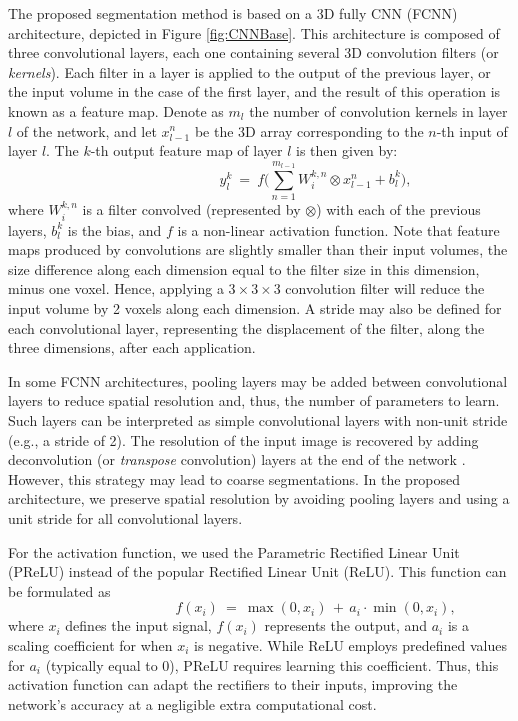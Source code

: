 \documentclass[twoside,fleqn,espcrc2]{elsarticle}
\newcommand{\vold}[1]{$#1\!\times\!#1\!\times\!#1$}
\begin{document}
The proposed segmentation method is based on a 3D fully CNN (FCNN) architecture, depicted in Figure \ref{fig:CNNBase}. This architecture is composed of three convolutional layers, each one containing several 3D convolution filters (or \emph{kernels}). Each filter in a layer is applied to the output of the previous layer, or the input volume in the case of the first layer, and the result of this operation is known as a feature map. Denote as $m_l$ the number of convolution kernels in layer $l$ of the network, and let $x^n_{l-1}$ be the 3D array corresponding to the $n$-th input of layer $l$. The $k$-th output feature map of layer $l$ is then given by:
\begin{equation}
\qquad \qquad \qquad \qquad
    y^k_l \ = \ f\Big(\sum^{m_{l-1}}_{n=1} W^{k,n}_{i} \otimes x^n_{l-1} + b^{k}_{l}\Big),
\end{equation}
where $W^{k,n}_{i}$ is a filter convolved (represented by $\otimes$) with each of the previous layers, $b^{k}_{l}$ is the bias, and $f$ is a non-linear activation function. Note that feature maps produced by convolutions are slightly smaller than their input volumes, the size difference along each dimension equal to the filter size in this dimension, minus one voxel. Hence, applying a \vold{3} convolution filter will reduce the input volume by 2 voxels along each dimension. A stride may also be defined for each convolutional layer, representing the displacement of the filter, along the three dimensions, after each application.

In some FCNN architectures, pooling layers may be added between convolutional layers to reduce spatial resolution and, thus, the number of parameters to learn. Such layers can be interpreted as simple convolutional layers with non-unit stride (e.g., a stride of 2). The resolution of the input image is recovered by adding deconvolution (or \emph{transpose} convolution) layers at the end of the network \cite{long2015fully}. However, this strategy may lead to coarse segmentations. In the proposed architecture, we preserve spatial resolution by avoiding pooling layers and using a unit stride for all convolutional layers.


For the activation function, we used the Parametric Rectified Linear Unit (PReLU) \cite{he2015delving} instead of the popular Rectified Linear Unit (ReLU). This function can be formulated as
\begin{equation}
	\qquad \qquad \qquad \qquad	f(x_i) \ = \ \max(0,x_i) \, + \, a_i \! \cdot \! \min(0,x_i),
\end{equation}
where $x_i$ defines the input signal, $f(x_i)$ represents the output, and $a_i$ is a scaling coefficient for when $x_i$ is negative. While ReLU employs predefined values for $a_i$ (typically equal to 0), PReLU requires learning this coefficient. Thus, this activation function can adapt the rectifiers to their inputs, improving the network's accuracy at a negligible extra computational cost.
\end{document}
